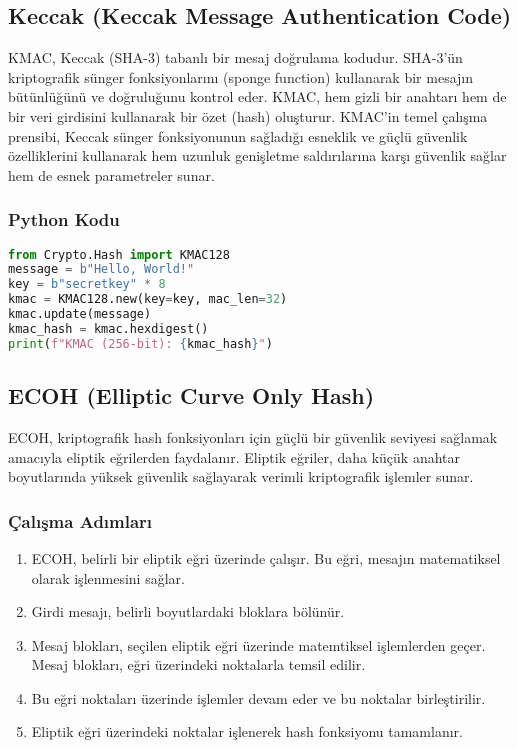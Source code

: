 \newpage

\subsection{Keccak (Keccak Message Authentication Code)}

KMAC, Keccak (SHA-3) tabanlı bir mesaj doğrulama kodudur. SHA-3'ün kriptografik sünger fonksiyonlarını (sponge function) kullanarak bir mesajın bütünlüğünü ve doğruluğunu kontrol eder. KMAC, hem gizli bir anahtarı hem de bir veri girdisini kullanarak bir özet (hash) oluşturur. KMAC'in temel çalışma prensibi, Keccak sünger fonksiyonunun sağladığı esneklik ve güçlü güvenlik özelliklerini kullanarak hem uzunluk genişletme saldırılarına karşı güvenlik sağlar hem de esnek parametreler sunar.

\subsubsection{Python Kodu}

\begin{lstlisting}[language=Python]
from Crypto.Hash import KMAC128
message = b"Hello, World!"
key = b"secretkey" * 8
kmac = KMAC128.new(key=key, mac_len=32)
kmac.update(message)
kmac_hash = kmac.hexdigest()
print(f"KMAC (256-bit): {kmac_hash}")
\end{lstlisting}

\newpage

\subsection{ECOH (Elliptic Curve Only Hash)}

ECOH, kriptografik hash fonksiyonları için güçlü bir güvenlik seviyesi sağlamak amacıyla eliptik eğrilerden faydalanır. Eliptik eğriler, daha küçük anahtar boyutlarında yüksek güvenlik sağlayarak verimli kriptografik işlemler sunar.

\subsubsection{Çalışma Adımları}

\begin{enumerate}
    \item ECOH, belirli bir eliptik eğri üzerinde çalışır. Bu eğri, mesajın matematiksel olarak işlenmesini sağlar.
    \item Girdi mesajı, belirli boyutlardaki bloklara bölünür.
    \item Mesaj blokları, seçilen eliptik eğri üzerinde matemtiksel işlemlerden geçer. Mesaj blokları, eğri üzerindeki noktalarla temsil edilir.
    \item Bu eğri noktaları üzerinde işlemler devam eder ve bu noktalar birleştirilir.
    \item Eliptik eğri üzerindeki noktalar işlenerek hash fonksiyonu tamamlanır.
\end{enumerate}

